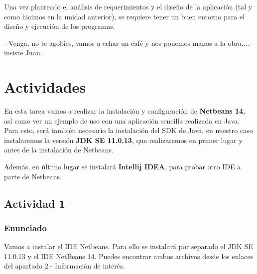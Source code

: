 Una vez planteado el análisis de requerimientos y el diseño de la aplicación (tal y como hicimos en la unidad anterior), se requiere tener un buen entorno para el diseño y ejecución de los programas.

- Venga, no te agobies, vamos a echar un café y nos ponemos manos a la obra,...- insiste Juan.

\section{Actividades}
En esta tarea vamos a realizar la instalación y configuración de \textbf{Netbeans 14}, así como ver un ejemplo de uso con una aplicación sencilla realizada en Java. Para esto, será también necesario la instalación del SDK de Java, en nuestro caso instalaremos la versión \textbf{JDK SE 11.0.13}, que realizaremos en primer lugar y antes de la instalación de Netbeans.

Además, en último lugar se instalará \textbf{Intellij IDEA}, para probar otro IDE a parte de Netbeans.

\subsection{Actividad 1}

\subsubsection{Enunciado}
Vamos a instalar el IDE Netbeans. Para ello se instalará por separado el JDK SE 11.0.13 y el IDE NetBeans 14. Puedes encontrar ambos archivos desde los enlaces del apartado 2.- Información de interés.

